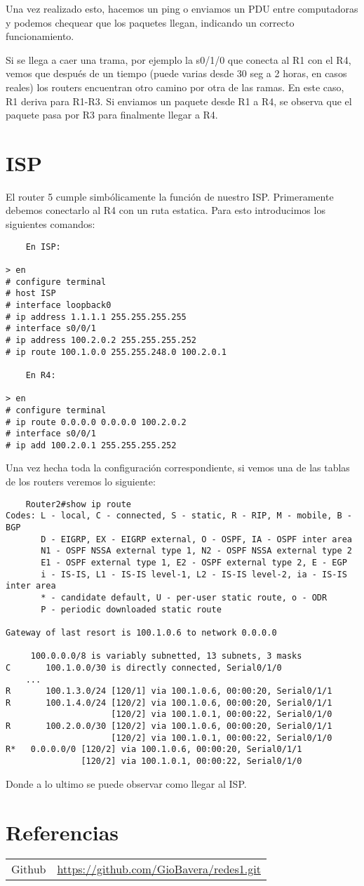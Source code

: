 \documentclass{article}
\begin{document}
Una vez realizado esto, hacemos un ping o enviamos un PDU entre computadoras y podemos chequear que los paquetes llegan, indicando un correcto funcionamiento. 

Si se llega a caer una trama, por ejemplo la s0/1/0 que conecta al R1 con el R4, vemos que después de un tiempo (puede varias desde 30 seg a 2 horas, en casos reales) los routers encuentran otro camino por otra de las ramas. En este caso, R1 deriva para R1-R3. Si enviamos un paquete desde R1 a R4, se observa que el paquete pasa por R3 para finalmente llegar a R4.  

\section{ISP}
El router 5 cumple simbólicamente la función de nuestro ISP. Primeramente debemos conectarlo al R4 con un ruta estatica. Para esto introducimos los siguientes comandos:

\begin{verbatim}
    En ISP:
    
> en
# configure terminal 
# host ISP
# interface loopback0
# ip address 1.1.1.1 255.255.255.255
# interface s0/0/1
# ip address 100.2.0.2 255.255.255.252
# ip route 100.1.0.0 255.255.248.0 100.2.0.1

    En R4: 
    
> en
# configure terminal 
# ip route 0.0.0.0 0.0.0.0 100.2.0.2 
# interface s0/0/1 
# ip add 100.2.0.1 255.255.255.252
\end{verbatim}

Una vez hecha toda la configuración correspondiente, si vemos una de las tablas de los routers veremos lo siguiente: 

\begin{verbatim}
    Router2#show ip route
Codes: L - local, C - connected, S - static, R - RIP, M - mobile, B - BGP
       D - EIGRP, EX - EIGRP external, O - OSPF, IA - OSPF inter area
       N1 - OSPF NSSA external type 1, N2 - OSPF NSSA external type 2
       E1 - OSPF external type 1, E2 - OSPF external type 2, E - EGP
       i - IS-IS, L1 - IS-IS level-1, L2 - IS-IS level-2, ia - IS-IS inter area
       * - candidate default, U - per-user static route, o - ODR
       P - periodic downloaded static route

Gateway of last resort is 100.1.0.6 to network 0.0.0.0

     100.0.0.0/8 is variably subnetted, 13 subnets, 3 masks
C       100.1.0.0/30 is directly connected, Serial0/1/0
    ...
R       100.1.3.0/24 [120/1] via 100.1.0.6, 00:00:20, Serial0/1/1
R       100.1.4.0/24 [120/2] via 100.1.0.6, 00:00:20, Serial0/1/1
                     [120/2] via 100.1.0.1, 00:00:22, Serial0/1/0
R       100.2.0.0/30 [120/2] via 100.1.0.6, 00:00:20, Serial0/1/1
                     [120/2] via 100.1.0.1, 00:00:22, Serial0/1/0
R*   0.0.0.0/0 [120/2] via 100.1.0.6, 00:00:20, Serial0/1/1
               [120/2] via 100.1.0.1, 00:00:22, Serial0/1/0
\end{verbatim}
Donde a lo ultimo se puede observar como llegar al ISP.

\section{Referencias}
\begin{tabular}{ll}
Github         & \url{https://github.com/GioBavera/redes1.git} \\
\end{tabular}
\end{document}
